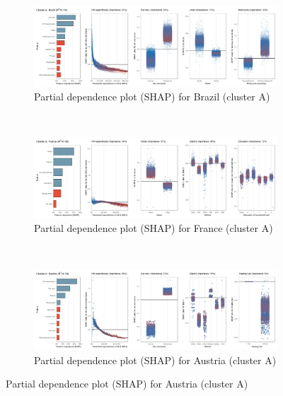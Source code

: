 \begin{figure}[ht!]\ContinuedFloat
    \centering
   \begin{subfigure}[b]{\textwidth}
         \centering
         \caption{Partial dependence plot (SHAP) for Brazil (cluster A)}
         \label{fig:5b_BRA}
         \includegraphics[width=\textwidth]{Figure 5b/Figure_5b_BRA}         
     \end{subfigure}
    \\
    \vspace{0.5cm}
   \begin{subfigure}[b]{\textwidth}
         \centering
         \caption{Partial dependence plot (SHAP) for France (cluster A)}
         \label{fig:5b_FRA}
         \includegraphics[width=\textwidth]{Figure 5b/Figure_5b_FRA}         
     \end{subfigure}
    \\
    \vspace{0.5cm}
   \begin{subfigure}[b]{\textwidth}
         \centering
         \caption{Partial dependence plot (SHAP) for Austria (cluster A)}
         \label{fig:5b_AUT}
         \includegraphics[width=\textwidth]{Figure 5b/Figure_5b_AUT}

\end{subfigure}
\end{figure}
